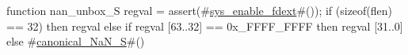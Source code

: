 function nan_unbox_S regval = {
  assert(#\hyperref[sailRISCVzsyszyenablezyfdext]{sys\_enable\_fdext}#());
  if (sizeof(flen) == 32)
  then regval
  else if regval [63..32] == 0x_FFFF_FFFF
       then regval [31..0]
       else #\hyperref[sailRISCVzcanonicalzyNaNzyS]{canonical\_NaN\_S}#()
}

